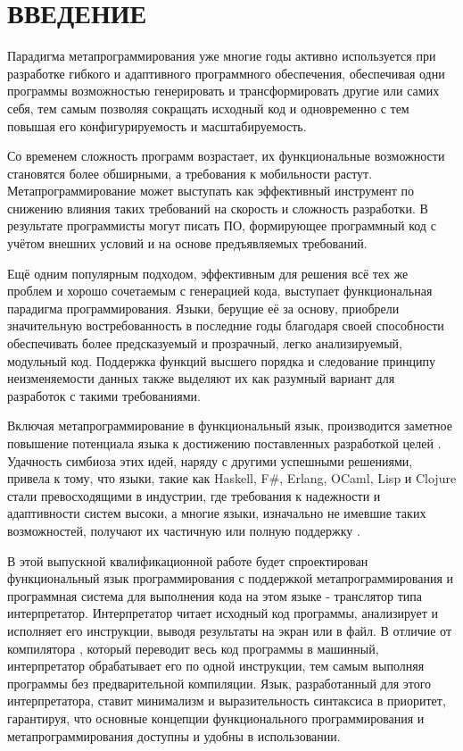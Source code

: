 \section*{ВВЕДЕНИЕ}

Парадигма метапрограммирования уже многие годы активно используется при разработке гибкого и адаптивного программного обеспечения, обеспечивая одни программы возможностью генерировать и трансформировать другие или самих себя, тем самым позволяя сокращать исходный код и одновременно с тем повышая его конфигурируемость и масштабируемость.

Со временем сложность программ возрастает, их функциональные возможности становятся более обширными, а требования к мобильности растут. Метапрограммирование может выступать как эффективный инструмент по снижению влияния таких требований на скорость и сложность разработки. В результате программисты могут писать ПО, формирующее программный код с учётом внешних условий и на основе предъявляемых требований.

Ещё одним популярным подходом, эффективным для решения всё тех же проблем и хорошо сочетаемым с генерацией кода, выступает функциональная парадигма программирования. Языки, берущие её за основу, приобрели значительную востребованность в последние годы благодаря своей способности обеспечивать более предсказуемый и прозрачный, легко анализируемый, модульный код. Поддержка функций высшего порядка и следование принципу неизменяемости данных также выделяют их как разумный вариант для разработок с такими требованиями.

Включая метапрограммирование в функциональный язык, производится заметное повышение потенциала языка к достижению поставленных разработкой целей \cite{e31}. Удачность симбиоза этих идей, наряду с другими успешными решениями, привела к тому, что языки, такие как Haskell, F\#, Erlang, OCaml, Lisp и Clojure стали превосходящими в индустрии, где требования к надежности и адаптивности систем высоки, а многие языки, изначально не имевшие таких возможностей, получают их частичную или полную поддержку \cite{e30}.

В этой выпускной квалификационной работе будет спроектирован функциональный язык программирования с поддержкой метапрограммирования и программная система для выполнения кода на этом языке - транслятор типа интерпретатор. Интерпретатор читает исходный код программы, анализирует и исполняет его инструкции, выводя результаты на экран или в файл. В отличие от компилятора \cite{e3}, который переводит весь код программы в машинный, интерпретатор обрабатывает его по одной инструкции, тем самым выполняя программы без предварительной компиляции. Язык, разработанный для этого интерпретатора, ставит минимализм и выразительность синтаксиса в приоритет, гарантируя, что основные концепции функционального программирования и метапрограммирования доступны и удобны в использовании.


